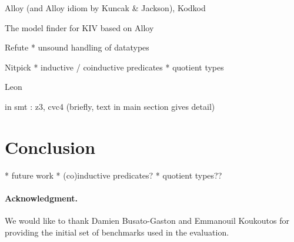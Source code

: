 \documentclass[runningheads,a4paper]{llncs}
\begin{document}
Alloy (and Alloy idiom by Kuncak \& Jackson), Kodkod

The model finder for KIV based on Alloy

Refute
  * unsound handling of datatypes

Nitpick
  * inductive / coinductive predicates
  * quotient types

Leon

in smt : z3, cvc4 (briefly, text in main section gives detail)

\section{Conclusion}
\label{sec:conclusion}

  * future work
    * (co)inductive predicates?
    * quotient types??

{%
\def\ackname{Acknowledgment}
\paragraph{%
\ackname.}
We would like to thank Damien Busato-Gaston and Emmanouil Koukoutos for
providing the initial set of benchmarks used in the evaluation.
}



{


}
\end{document}
